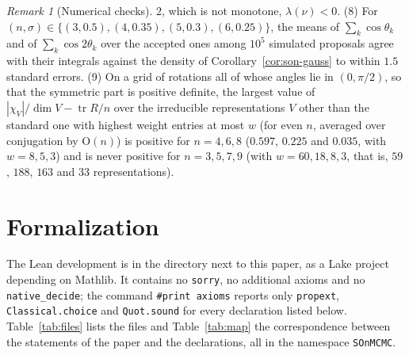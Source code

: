 \documentclass[11pt]{amsart}
\theoremstyle{definition}
\theoremstyle{remark}
\newtheorem{remark}[theorem]{Remark}
\newcommand{\Or}{\mathrm{O}}
\newcommand{\tr}{\operatorname{tr}}
\begin{document}
\begin{remark}[Numerical checks]
$2$, which is not monotone, $\lambda(\nu)<0$.
(8) For $(n,\sigma)\in\{(3,0.5),(4,0.35),(5,0.3),(6,0.25)\}$, the means of $\sum_k\cos\theta_k$
and of $\sum_k\cos2\theta_k$ over the accepted ones among $10^5$ simulated proposals agree with
their integrals against the density of Corollary~\ref{cor:son-gauss} to within $1.5$ standard
errors.
(9) On a grid of rotations all of whose angles lie in $(0,\pi/2)$, so that the symmetric part is
positive definite, the largest value of $|\chi_V|/\dim V-\tr R/n$ over the irreducible
representations $V$ other than the standard one with highest weight entries at most $w$ (for even
$n$, averaged over conjugation by $\Or(n)$) is positive for $n=4,6,8$ ($0.597$, $0.225$ and
$0.035$, with $w=8,5,3$) and is never positive for $n=3,5,7,9$ (with $w=60,18,8,3$, that is,
$59$, $188$, $163$ and $33$ representations).
\end{remark}

\section{Formalization}\label{sec:formal}

The Lean development is in the directory  next to this paper, as a Lake project
 depending on Mathlib.  It contains no \texttt{sorry}, no additional axioms and no
\texttt{native\_decide}; the command \texttt{\#print axioms} reports only \texttt{propext},
\texttt{Classical.choice} and \texttt{Quot.sound} for every declaration listed below.
Table~\ref{tab:files} lists the files and Table~\ref{tab:map} the correspondence between the
statements of the paper and the declarations, all in the namespace \texttt{SOnMCMC}.
\end{document}
